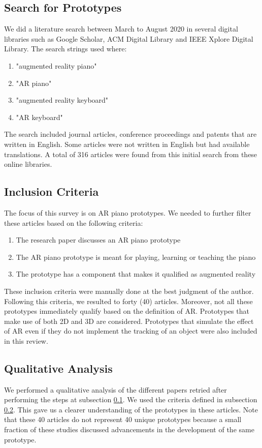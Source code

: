 \documentclass[manuscript,screen]{acmart}
\begin{document}
\subsection{Search for Prototypes}
\label{subsec: search}
We did a literature search between March to August 2020 in several digital libraries such as Google Scholar, ACM Digital Library and IEEE Xplore Digital Library. The search strings used where:
\begin{enumerate}
    \item "augmented reality piano"
    \item "AR piano"
    \item "augmented reality keyboard"
    \item "AR keyboard"
\end{enumerate}
The search included journal articles, conference proceedings and patents that are written in English. Some articles were not written in English but had available translations. A total of 316 articles were found from this initial search from these online libraries. 
\subsection{Inclusion Criteria}
\label{subsec: criteria}
The focus of this survey is on AR piano prototypes. We needed to further filter these articles based on the following criteria:
\begin{enumerate}
    \item The research paper discusses an AR piano prototype 
    \item The AR piano prototype is meant for playing, learning or teaching the piano
    \item The prototype has a component that makes it qualified as augmented reality
\end{enumerate}
These inclusion criteria were manually done at the best judgment of the author. Following this criteria, we resulted to forty (40) articles. Moreover, not all these prototypes immediately qualify based on the definition of AR. Prototypes that make use of both 2D and 3D are considered. Prototypes that simulate the effect of AR even if they do not implement the tracking of an object were also included in this review. 

\subsection{Qualitative Analysis}
We performed a qualitative analysis of the different papers retried after performing the steps at subsection \ref{subsec: search}. We used the criteria defined in subsection \ref{subsec: criteria}. This gave us a clearer understanding of the prototypes in these articles. Note that these 40 articles do not represent 40 unique prototypes because a small fraction of these studies discussed advancements in the development of the same prototype. \\
\end{document}
